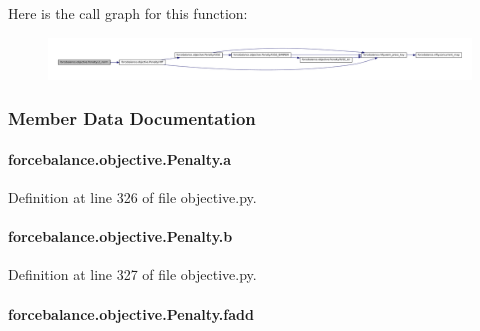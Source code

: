 Here is the call graph for this function\-:\nopagebreak
\begin{figure}[H]
\begin{center}
\leavevmode
\includegraphics[width=350pt]{classforcebalance_1_1objective_1_1Penalty_ab59d5beafbab0918b7c3e0c61ece41a3_cgraph}
\end{center}
\end{figure}




\subsubsection{Member Data Documentation}
\hypertarget{classforcebalance_1_1objective_1_1Penalty_abab984da8a8f62adbd1decbaf56ac2fa}{
\paragraph[{a}]{\setlength{\rightskip}{0pt plus 5cm}forcebalance.\-objective.\-Penalty.\-a}}\label{classforcebalance_1_1objective_1_1Penalty_abab984da8a8f62adbd1decbaf56ac2fa}


Definition at line 326 of file objective.\-py.

\hypertarget{classforcebalance_1_1objective_1_1Penalty_a0d9da5669d74dfd54a2fc639424e37b6}{
\paragraph[{b}]{\setlength{\rightskip}{0pt plus 5cm}forcebalance.\-objective.\-Penalty.\-b}}\label{classforcebalance_1_1objective_1_1Penalty_a0d9da5669d74dfd54a2fc639424e37b6}


Definition at line 327 of file objective.\-py.

\hypertarget{classforcebalance_1_1objective_1_1Penalty_a8c93cd0cfa455a54f957a061b5f7ac50}{
\paragraph[{fadd}]{\setlength{\rightskip}{0pt plus 5cm}forcebalance.\-objective.\-Penalty.\-fadd}}\label{classforcebalance_1_1objective_1_1Penalty_a8c93cd0cfa455a54f957a061b5f7ac50}



